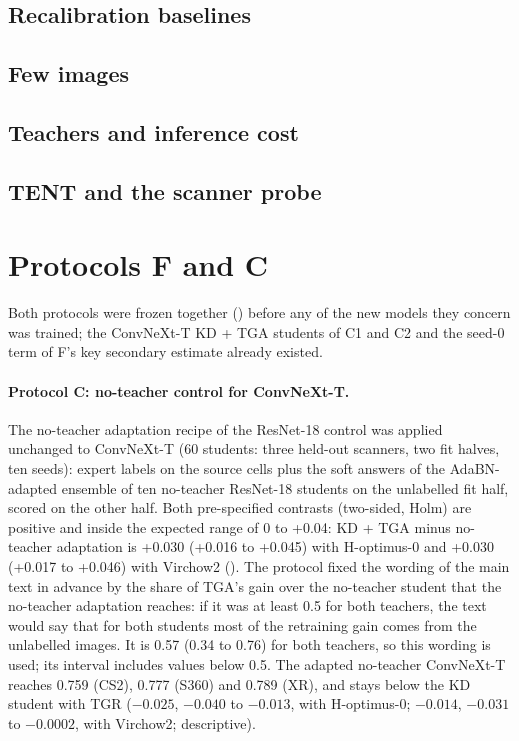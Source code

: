 \subsection{Recalibration baselines}
\label{app:baselines}




\FloatBarrier
\subsection{Few images}
\label{app:few}


\FloatBarrier
\subsection{Teachers and inference cost}
\label{app:teachers}



\FloatBarrier
\subsection{TENT and the scanner probe}
\label{app:tent}



\FloatBarrier
\section{Protocols F and C}
\label{app:fc}
Both protocols were frozen together () before any of the new models they concern was
trained; the ConvNeXt-T KD + TGA students of C1 and C2 and the seed-0 term of F's key secondary estimate already existed.

\paragraph{Protocol C: no-teacher control for ConvNeXt-T.} The no-teacher adaptation recipe of the ResNet-18 control
was applied unchanged to ConvNeXt-T (60 students: three held-out scanners, two fit halves, ten seeds): expert labels on
the source cells plus the soft answers of the AdaBN-adapted ensemble of ten no-teacher ResNet-18 students on the
unlabelled fit half, scored on the other half. Both pre-specified contrasts (two-sided, Holm) are positive and inside
the expected range of 0 to +0.04: KD + TGA minus no-teacher adaptation is +0.030 (+0.016 to +0.045) with H-optimus-0
and +0.030 (+0.017 to +0.046) with Virchow2 (). The protocol fixed the wording of the main
text in advance by the share of TGA's gain over the no-teacher student that the no-teacher adaptation reaches: if it
was at least 0.5 for both teachers, the text would say that for both students most of the retraining gain comes from
the unlabelled images. It is 0.57 (0.34 to 0.76) for both teachers, so this wording is used; its interval includes values
below 0.5. The adapted no-teacher ConvNeXt-T reaches 0.759 (CS2), 0.777 (S360) and 0.789 (XR), and stays below the KD
student with TGR ($-0.025$, $-0.040$ to $-0.013$, with H-optimus-0; $-0.014$, $-0.031$ to $-0.0002$, with Virchow2;
descriptive).


